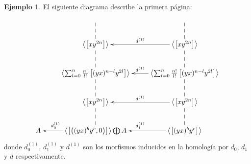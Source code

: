 \documentclass[a4paper,oneside,fleqn,11pt]{report}
\theoremstyle{definition}
\theoremstyle{definition}
\newtheorem{example}{Ejemplo}[section]
\numberwithin{prop}{subsection}
\begin{document}
\begin{example}
El siguiente diagrama describe la primera página:
\begin{align*}
\xymatrix{
	& & \\
	& \left\langle \left[xy^{2n}\right] \right\rangle \ar@{--}[u] & \left\langle \left[xy^{2n}\right] \right\rangle \ar[l]_{d^{(1)}} \ar@{--}[u]\\
	& \left\langle \sum_{l = 0}^n \frac{n!}{l!}\left[(yx)^{n - l}y^{2l}\right] \right\rangle \ar@{--}[u]
		& \left\langle \sum_{l = 0}^n \frac{n!}{l!}\left[(yx)^{n - l}y^{2l}\right] \right\rangle \ar[l]_{d^{(1)}} \ar@{--}[u]\\
	& \left\langle \left[xy^{2n}\right] \right\rangle \ar@{--}[u] & \left\langle \left[xy^{2n}\right] \right\rangle \ar[l]_{d^{(1)}} \ar@{--}[u]\\
	A & \left\langle \left[\left((yx)^by^c, 0\right)\right] \right\rangle \bigoplus A \ar[l]_(.7){d_0^{(1)}} \ar@{--}[u]
		& \left\langle \left[(yx)^by^c\right] \right\rangle \ar[l]_{d_1^{(1)}} \ar@{--}[u] \\
}
\end{align*}
donde $d_0^{(1)}$, $d_1^{(1)}$ y $d^{(1)}$ son los morfismos inducidos en la homología por $d_0$, $d_1$ y $d$ respectivamente.




\end{example}
\end{document}
